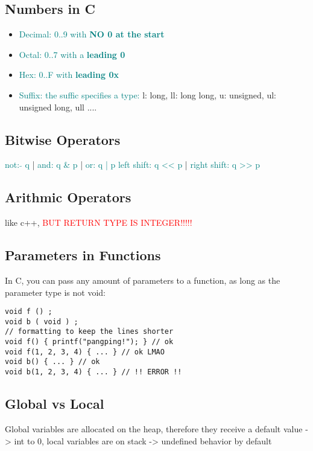 \documentclass[main.tex,fontsize=8pt,paper=a4,paper=landscape,DIV=calc,]{scrartcl}
\begin{document}
\begin{multicols*}{4}
\subsection{Numbers in C}
\begin{itemize}
\item \textcolor{teal}{Decimal: 0..9 with \textbf{NO 0 at the start}}
\item \textcolor{teal}{Octal: 0..7 with a \textbf{leading 0}}
\item \textcolor{teal}{Hex: 0..F with \textbf{leading 0x}}
\item \textcolor{teal}{Suffix: the suffic specifies a type:}\newline
  l: long, ll: long long, u: unsigned, ul: unsigned long, ull ....
\end{itemize} 

\subsection{Bitwise Operators}
\textcolor{teal}{not: \(\tilde{} \) q} | \textcolor{teal}{and: q \& p} | \textcolor{teal}{or: q | p} \newline
\textcolor{teal}{left shift: q << p} | \textcolor{teal}{right shift: q >> p}

\subsection{Arithmic Operators}
like c++, \textcolor{red}{BUT RETURN TYPE IS INTEGER!!!!!}

\subsection{Parameters in Functions}
In C, you can pass any amount of parameters to a function, as long as the parameter type is not void:
\vspace{-2.5mm}
\begin{lstlisting}
void f () ;
void b ( void ) ;
// formatting to keep the lines shorter
void f() { printf("pangping!"); } // ok
void f(1, 2, 3, 4) { ... } // ok LMAO
void b() { ... } // ok
void b(1, 2, 3, 4) { ... } // !! ERROR !!
\end{lstlisting}
\vspace{2mm}

\subsection{Global vs Local}
Global variables are allocated on the heap, therefore they receive a default value -> int to 0, local variables are on stack -> undefined behavior by default


\end{multicols*}
\end{document}
